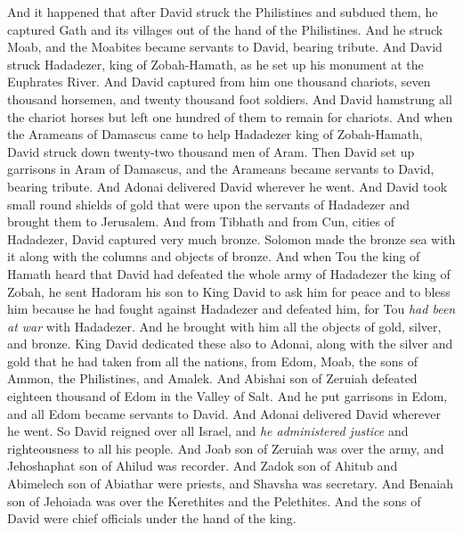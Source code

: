 \begin{biblechapter} %
 And it happened that after David struck the Philistines and subdued them, he captured Gath and its villages out of the hand of the Philistines.
\verse And he struck Moab, and the Moabites became servants to David, bearing tribute.
\verse And David struck Hadadezer, king of Zobah-Hamath, as he set up his monument at the Euphrates River.
\verse And David captured from him one thousand chariots, seven thousand horsemen, and twenty thousand foot soldiers. And David hamstrung all the chariot horses but left one hundred of them to remain for chariots.
\verse And when the Arameans of Damascus came to help Hadadezer king of Zobah-Hamath, David struck down twenty-two thousand men of Aram.
\verse Then David set up garrisons in Aram of Damascus, and the Arameans became servants to David, bearing tribute. And Adonai delivered David wherever he went.
\verse And David took small round shields of gold that were upon the servants of Hadadezer and brought them to Jerusalem.
\verse And from Tibhath and from Cun, cities of Hadadezer, David captured very much bronze. Solomon made the bronze sea with it along with the columns and objects of bronze.
\verse And when Tou the king of Hamath heard that David had defeated the whole army of Hadadezer the king of Zobah,
\verse he sent Hadoram his son to King David to ask him for peace and to bless him because he had fought against Hadadezer and defeated him, for Tou \textit{had been at war} with Hadadezer. And he brought with him all the objects of gold, silver, and bronze.
\verse King David dedicated these also to Adonai, along with the silver and gold that he had taken from all the nations, from Edom, Moab, the sons of Ammon, the Philistines, and Amalek.
\verse And Abishai son of Zeruiah defeated eighteen thousand of Edom in the Valley of Salt.
\verse And he put garrisons in Edom, and all Edom became servants to David. And Adonai delivered David wherever he went.
 So David reigned over all Israel, and \textit{he administered justice} and righteousness to all his people.
\verse And Joab son of Zeruiah was over the army, and Jehoshaphat son of Ahilud was recorder.
\verse And Zadok son of Ahitub and Abimelech son of Abiathar were priests, and Shavsha was secretary.
\verse And Benaiah son of Jehoiada was over the Kerethites and the Pelethites. And the sons of David were chief officials under the hand of the king.
\end{biblechapter}

